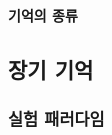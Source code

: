 \documentclass{beamer}
\begin{document}
\begin{frame}{\textbf{기억의 종류}}
\end{frame}

\subsection{장기 기억}
\subsubsection{실험 패러다임}
\end{document}

